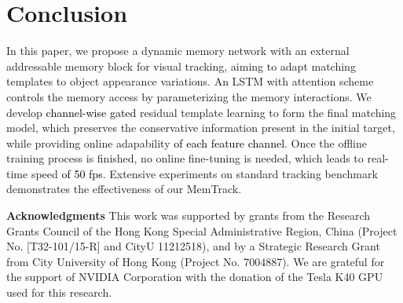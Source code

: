 \documentclass[runningheads]{llncs}
\newcommand{\abc}[1]{\textcolor{black}{#1}}
\newcommand{\abcn}[1]{\textcolor{black}{#1}}
\begin{document}
\section{Conclusion}
In this paper, we propose a dynamic memory network with an external addressable memory block for visual tracking, aiming to adapt matching templates to object appearance variations. %
An LSTM with attention scheme controls the memory access by parameterizing the memory interactions. We develop \abc{channel-wise gated} residual template learning to form the final matching model, which preserves the conservative information present in the initial target, while providing online adapability \abc{of each feature channel}. Once the offline training process is finished, no online fine-tuning %
is needed, %
which leads to real-time speed \abcn{of 50 fps}. Extensive experiments on standard tracking benchmark demonstrates the effectiveness %
of our MemTrack.

\noindent \textbf{Acknowledgments} This work was supported by grants from the Research Grants Council of the Hong Kong Special Administrative Region, China (Project No. [T32-101/15-R] and CityU 11212518), and by a Strategic Research Grant from City University of Hong Kong (Project No. 7004887). We are grateful for the support of NVIDIA Corporation with the donation of the Tesla K40 GPU used for this research.
\clearpage



\end{document}
